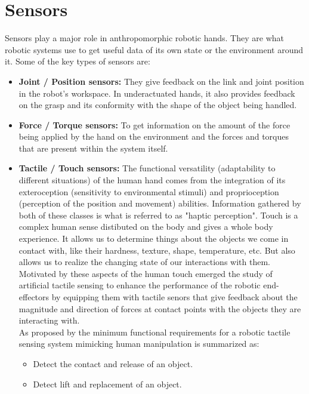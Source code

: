 \documentclass[a4paper, 10pt, conference]{ieeeconf}      %
\begin{document}
\section{\textbf{Sensors}}
Sensors play a major role in anthropomorphic robotic hands. They are what robotic systems use to get useful data of its own state or the environment around it. Some of the key types of sensors are:\\
	\begin{itemize}
	\item \textbf{Joint / Position sensors:} They give feedback on the link and joint position in the robot’s workspace. In underactuated hands, it also provides feedback on the grasp and its conformity with the shape of the object being handled.\\
	\item \textbf{Force / Torque sensors:} To get information on the amount of the force being applied by the hand on the environment and the forces and torques that are present within the system itself.\\
	\item \textbf{Tactile / Touch sensors:} The functional versatility (adaptability to different situations) of the human hand comes from the integration of its exteroception (sensitivity to environmental stimuli) and proprioception (perception of the position and movement) abilities.
Information gathered by both of these classes is what is referred to as "haptic perception".
Touch is a complex human sense distibuted on the body and gives a whole body experience. It allows us to determine things about the objects we come in contact with, like their hardness, texture, shape, temperature, etc. But also allows us to realize the changing state of our interactions with them.\\
Motivated by these aspects of the human touch emerged the study of artificial tactile sensing to enhance the performance of the robotic end-effectors by equipping them with tactile senors that give feedback about the magnitude and direction of forces at contact points with the objects they are interacting with.\\
As proposed by \cite{yousef2011tactile} the minimum functional requirements for a robotic tactile sensing system mimicking human manipulation is summarized as:\\
		\begin{itemize}
			\item Detect the contact and release of an object.
			\item Detect lift and replacement of an object.

\end{itemize}
\end{itemize}
\end{document}

